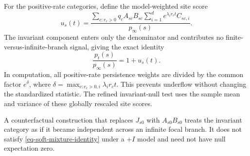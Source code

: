 For the positive-rate categories, define the model-weighted site score
\begin{equation}
u_s(t)
=
\frac{
\displaystyle
\sum_{c:r_c>0}q_cA_{sc}B_{sc}
\sum_{i=1}^{d}e^{\lambda_i r_ct}C_{sc,i}
}{p_\infty(s)}.
\label{eq-soft-mixture-score}
\end{equation}
The invariant component enters only the denominator and contributes no finite-versus-infinite-branch signal, giving the exact identity
\begin{equation}
\frac{p_t(s)}{p_\infty(s)}=1+u_s(t).
\label{eq-soft-mixture-identity}
\end{equation}
In computation, all positive-rate persistence weights are divided by the common factor \(e^\delta\), where \(\delta=\max_{c:r_c>0,i}\lambda_i r_ct\). This prevents underflow without changing the standardized statistic. The refined invariant-null test uses the sample mean and variance of these globally rescaled site scores.

A counterfactual construction that replaces \(J_{s0}\) with \(A_{s0}B_{s0}\) treats the invariant category as if it became independent across an infinite focal branch. It does not satisfy \cref{eq-soft-mixture-identity} under a \(+I\) model and need not have null expectation zero.
